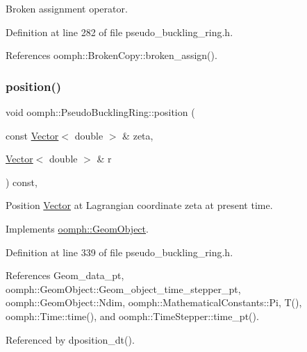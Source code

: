Broken assignment operator. 



Definition at line 282 of file pseudo\+\_\+buckling\+\_\+ring.\+h.



References oomph\+::\+Broken\+Copy\+::broken\+\_\+assign().

\mbox{\label{classoomph_1_1PseudoBucklingRing_a1cd6c36f2f84385b6485933b18cbbe43}} 
\subsubsection{\texorpdfstring{position()}{position()}\hspace{0.1cm}{\footnotesize\ttfamily [1/2]}}
{\footnotesize\ttfamily void oomph\+::\+Pseudo\+Buckling\+Ring\+::position (\begin{DoxyParamCaption}\item[{const \hyperlink{classoomph_1_1Vector}{Vector}$<$ double $>$ \&}]{zeta,  }\item[{\hyperlink{classoomph_1_1Vector}{Vector}$<$ double $>$ \&}]{r }\end{DoxyParamCaption}) const\hspace{0.3cm}{\ttfamily [inline]}, {\ttfamily [virtual]}}



Position \hyperlink{classoomph_1_1Vector}{Vector} at Lagrangian coordinate zeta at present time. 



Implements \hyperlink{classoomph_1_1GeomObject_a0d04c9d4667817f3ef24bb660fd56065}{oomph\+::\+Geom\+Object}.



Definition at line 339 of file pseudo\+\_\+buckling\+\_\+ring.\+h.



References Geom\+\_\+data\+\_\+pt, oomph\+::\+Geom\+Object\+::\+Geom\+\_\+object\+\_\+time\+\_\+stepper\+\_\+pt, oomph\+::\+Geom\+Object\+::\+Ndim, oomph\+::\+Mathematical\+Constants\+::\+Pi, T(), oomph\+::\+Time\+::time(), and oomph\+::\+Time\+Stepper\+::time\+\_\+pt().



Referenced by dposition\+\_\+dt().

\mbox{\label{classoomph_1_1PseudoBucklingRing_a027211cc7067efa849e605b456cb5462}} 
